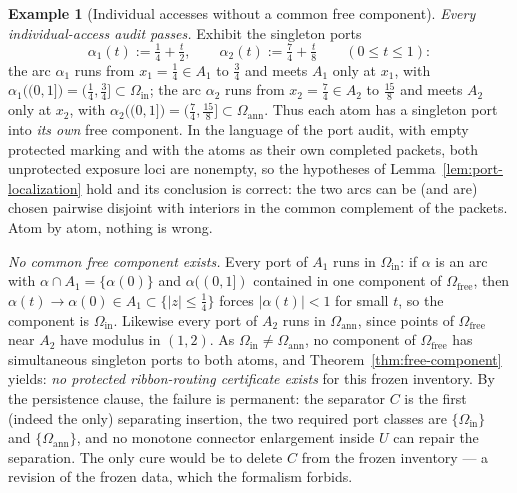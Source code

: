 \documentclass[11pt,reqno]{amsart}
\theoremstyle{definition}
\newtheorem{example}[theorem]{Example}
\theoremstyle{remark}
\newcommand{\Omfree}{\Omega_{\mathrm{free}}}
\begin{document}
\begin{example}[Individual accesses without a common free component]
\emph{Every individual-access audit passes.} Exhibit the singleton ports
\[
\alpha_1(t):=\tfrac14+\tfrac t2,
\qquad
\alpha_2(t):=\tfrac74+\tfrac t8
\qquad(0\le t\le1):
\]
the arc $\alpha_1$ runs from $x_1=\tfrac14\in A_1$ to $\tfrac34$ and meets $A_1$ only at
$x_1$, with $\alpha_1\bigl((0,1]\bigr)=(\tfrac14,\tfrac34]\subset\Omega_{\mathrm{in}}$;
the arc $\alpha_2$ runs from $x_2=\tfrac74\in A_2$ to $\tfrac{15}8$ and meets $A_2$ only
at $x_2$, with
$\alpha_2\bigl((0,1]\bigr)=(\tfrac74,\tfrac{15}8]\subset\Omega_{\mathrm{ann}}$. Thus
each atom has a singleton port into \emph{its own} free component. In the language of
the port audit, with empty protected marking and with the atoms as their own completed
packets, both unprotected exposure loci are nonempty, so the hypotheses of
Lemma~\ref{lem:port-localization} hold and its conclusion is correct: the two arcs can
be (and are) chosen pairwise disjoint with interiors in the common complement of the
packets. Atom by atom, nothing is wrong.

\emph{No common free component exists.} Every port of $A_1$ runs in
$\Omega_{\mathrm{in}}$: if $\alpha$ is an arc with
$\alpha\cap A_1=\{\alpha(0)\}$ and $\alpha((0,1])$ contained in one component of
$\Omfree$, then $\alpha(t)\to\alpha(0)\in A_1\subset\{|z|\le\tfrac14\}$ forces
$|\alpha(t)|<1$ for small $t$, so the component is $\Omega_{\mathrm{in}}$. Likewise
every port of $A_2$ runs in $\Omega_{\mathrm{ann}}$, since points of $\Omfree$ near
$A_2$ have modulus in $(1,2)$. As $\Omega_{\mathrm{in}}\neq\Omega_{\mathrm{ann}}$, no
component of $\Omfree$ has simultaneous singleton ports to both atoms, and
Theorem~\ref{thm:free-component} yields: \emph{no protected ribbon-routing certificate
exists} for this frozen inventory. By the persistence clause, the failure is permanent:
the separator $C$ is the first (indeed the only) separating insertion, the two required
port classes are $\{\Omega_{\mathrm{in}}\}$ and $\{\Omega_{\mathrm{ann}}\}$, and no
monotone connector enlargement inside $U$ can repair the separation. The only cure
would be to delete $C$ from the frozen inventory --- a revision of the frozen data,
which the formalism forbids.
\end{example}
\end{document}
